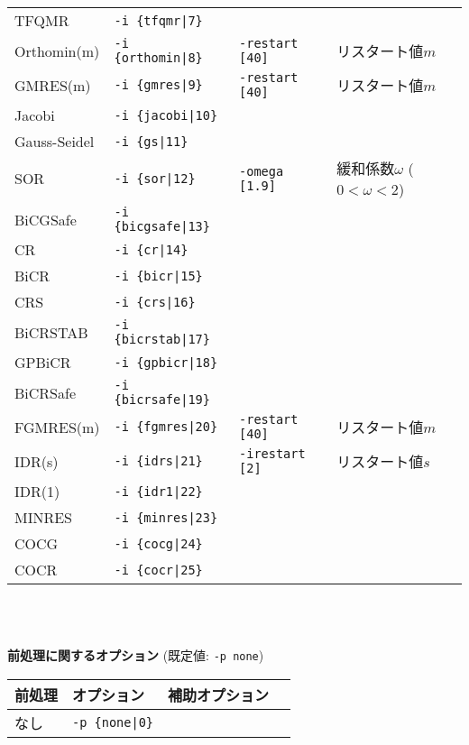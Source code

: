 \documentclass[a4paper]{jarticle}
\begin{document}
{{\begin{minipage}[t]{\textwidth}
\begin{center}
\begin{tabular}{l|lll}
 TFQMR       & \verb=-i {tfqmr|7}=      &    \\
 Orthomin(m) & \verb=-i {orthomin|8}=   & \verb=-restart [40]= & リスタート値$m$  \\
 GMRES(m)    & \verb=-i {gmres|9}=      & \verb=-restart [40]= & リスタート値$m$  \\ 
 Jacobi      & \verb=-i {jacobi|10}=    &    \\
 Gauss-Seidel& \verb=-i {gs|11}=        &    \\
 SOR         & \verb=-i {sor|12}=       & \verb=-omega [1.9]=  & 緩和係数$\omega$ ($0<\omega<2$) \\
 BiCGSafe    & \verb=-i {bicgsafe|13}=  &    \\
 CR          & \verb=-i {cr|14}=        &    \\ 
 BiCR        & \verb=-i {bicr|15}=      &    \\
 CRS         & \verb=-i {crs|16}=       &    \\
 BiCRSTAB    & \verb=-i {bicrstab|17}=  &    \\
 GPBiCR      & \verb=-i {gpbicr|18}=    &    \\
 BiCRSafe    & \verb=-i {bicrsafe|19}=  &    \\
 FGMRES(m)   & \verb=-i {fgmres|20}=    & \verb=-restart [40]= & リスタート値$m$  \\ 
 IDR(s)      & \verb=-i {idrs|21}=      & \verb=-irestart [2]= & リスタート値$s$  \\
 IDR(1)      & \verb=-i {idr1|22}=      &    \\ 
 MINRES      & \verb=-i {minres|23}=    &    \\
 COCG        & \verb=-i {cocg|24}=      &    \\
 COCR        & \verb=-i {cocr|25}=      &    \\   
\hline         
\end{tabular}
\end{center}
\end{minipage}
\\ \\
\begin{minipage}[t]{\textwidth}
\begin{center}
{\bf 前処理に関するオプション} (既定値: \verb=-p none=) \\
\begin{tabular}{l|lll}\hline\hline
前処理   & オプション           & 補助オプション \\ \hline
なし     & \verb=-p {none|0}=    &   \\

\end{tabular}
\end{center}
\end{minipage}}}
\end{document}
